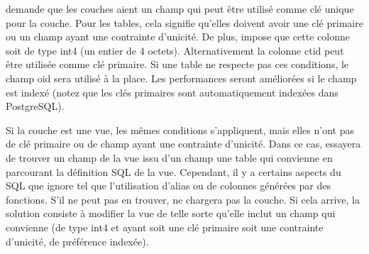 \qg demande que les couches \psq aient un champ qui peut être utilisé 
comme clé unique pour la couche. Pour les tables, cela signifie qu'elles 
doivent avoir une clé primaire ou un champ ayant une contrainte d'unicité. 
De plus, \qg impose que cette colonne soit de type int4 (un entier de 4 
octets). Alternativement la colonne ctid peut être utilisée comme clé 
primaire. Si une table ne respecte pas ces conditions, le champ oid sera utilisé à la place. Les performances seront améliorées si le 
champ est indexé (notez que les clés primaires sont automatiquement 
indexées dans PostgreSQL).

Si la couche \psq est une vue, les mêmes conditions s'appliquent, mais 
elles n'ont pas de clé primaire ou de champ ayant une contrainte 
d'unicité. Dans ce cas, \qg essayera de trouver un champ de la vue 
issu d'un champ une table qui convienne en parcourant la définition 
SQL de la vue. Cependant, il y a certains aspects du SQL que \qg 
ignore tel que l'utilisation d'alias ou de colonnes générées par 
des fonctions. S'il ne peut pas en trouver, \qg ne chargera pas la 
couche. Si cela arrive, la solution consiste à modifier la vue de 
telle sorte qu'elle inclut un champ qui convienne (de type int4 et 
ayant soit une clé primaire soit une contrainte d'unicité, de 
préférence indexée).

